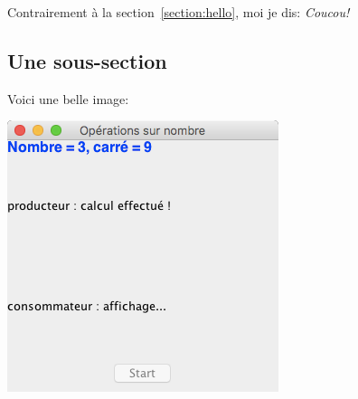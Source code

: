 \documentclass{article}
\begin{document}
Contrairement à la section~\ref{section:hello},
moi je dis: \textit{Coucou!}

\subsection{Une sous-section}
Voici une belle image:
\begin{center}
  \includegraphics[scale=0.5]{exo3_1_1.png}
\end{center}





\end{document}
